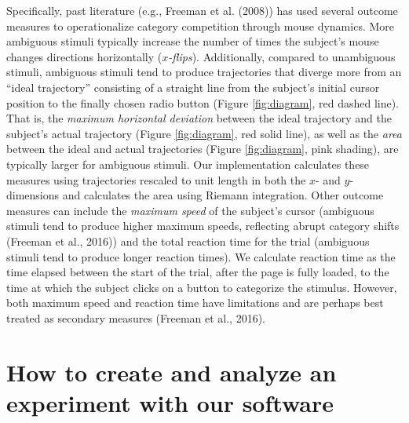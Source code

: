 \documentclass[]{article}
\begin{document}
Specifically, past literature (e.g., Freeman et al. (2008)) has used
several outcome measures to operationalize category competition through
mouse dynamics. More ambiguous stimuli typically increase the number of
times the subject's mouse changes directions horizontally
(\emph{$x$-flips}). Additionally, compared to unambiguous stimuli,
ambiguous stimuli tend to produce trajectories that diverge more from an
``ideal trajectory'' consisting of a straight line from the subject's
initial cursor position to the finally chosen radio button (Figure
\ref{fig:diagram}, red dashed line). That is, the
\emph{maximum horizontal deviation} between the ideal trajectory and the
subject's actual trajectory (Figure \ref{fig:diagram}, red solid line),
as well as the \emph{area} between the ideal and actual trajectories
(Figure \ref{fig:diagram}, pink shading), are typically larger for
ambiguous stimuli. Our implementation calculates these measures using
trajectories rescaled to unit length in both the \(x\)- and
\(y\)-dimensions and calculates the area using Riemann integration.
Other outcome measures can include the \emph{maximum speed} of the
subject's cursor (ambiguous stimuli tend to produce higher maximum
speeds, reflecting abrupt category shifts (Freeman et al., 2016)) and
the total reaction time for the trial (ambiguous stimuli tend to produce
longer reaction times). We calculate reaction time as the time elapsed
between the start of the trial, after the page is fully loaded, to the
time at which the subject clicks on a button to categorize the stimulus.
However, both maximum speed and reaction time have limitations and are
perhaps best treated as secondary measures (Freeman et al., 2016).

\section{How to create and analyze an experiment with our software}
\end{document}
